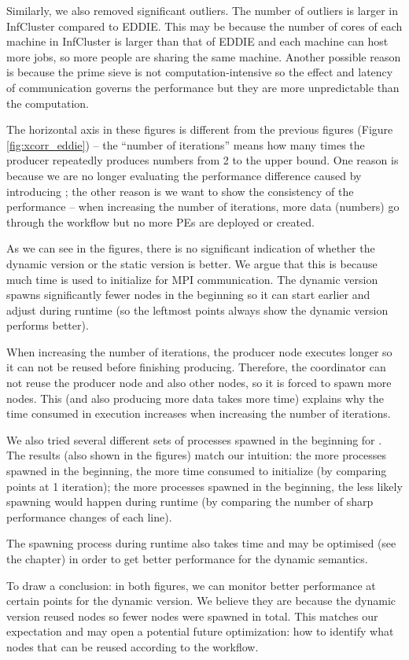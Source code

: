 Similarly, we also removed significant outliers. The number of outliers is larger in InfCluster compared to EDDIE. This may be because the number of cores of each machine in InfCluster is larger than that of EDDIE and each machine can host more jobs, so more people are sharing the same machine. Another possible reason is because the prime sieve is not computation-intensive so the effect and latency of communication governs the performance but they are more unpredictable than the computation.

The horizontal axis in these figures is different from the previous figures (\eg Figure \ref{fig:xcorr_eddie}) -- the ``number of iterations'' means how many times the producer repeatedly produces numbers from 2 to the upper bound. One reason is because we are no longer evaluating the performance difference caused by introducing \tincdep; the other reason is we want to show the consistency of the performance -- when increasing the number of iterations, more data (numbers) go through the workflow but no more PEs are deployed or created.

As we can see in the figures, there is no significant indication of whether the dynamic version or the static version is better. We argue that this is because much time is used to initialize for MPI communication. The dynamic version spawns significantly fewer nodes in the beginning so it can start earlier and adjust during runtime (so the leftmost points always show the dynamic version performs better). 

When increasing the number of iterations, the producer node executes longer so it can not be reused before finishing producing. Therefore, the coordinator can not reuse the producer node and also other nodes, so it is forced to spawn more nodes. This (and also producing more data takes more time) explains why the time consumed in execution increases when increasing the number of iterations.

We also tried several different sets of processes spawned in the beginning for \tdynexp. The results (also shown in the figures) match our intuition: the more processes spawned in the beginning, the more time consumed to initialize (by comparing points at 1 iteration); the more processes spawned in the beginning, the less likely spawning would happen during runtime (by comparing the number of sharp performance changes of each line).

The spawning process during runtime also takes time and may be optimised (see the  chapter) in order to get better performance for the dynamic semantics.

To draw a conclusion: in both figures, we can monitor better performance at certain points for the dynamic version. We believe they are because the dynamic version reused nodes so fewer nodes were spawned in total. This matches our expectation and may open a potential future optimization: how to identify what nodes that can be reused according to the workflow.
